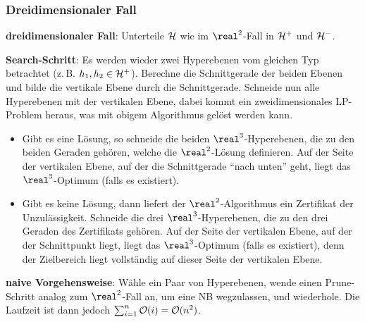 \pagebreak

\subsubsection{%
    Dreidimensionaler Fall%
}

\textbf{dreidimensionaler Fall}:
Unterteile $\mathcal{H}$ wie im $\real^2$-Fall in $\mathcal{H}^+$ und $\mathcal{H}^-$.

\textbf{Search-Schritt}:
Es werden wieder zwei Hyperebenen vom gleichen Typ betrachtet (z.\,B. $h_1, h_2 \in \mathcal{H}^+$).
Berechne die Schnittgerade der beiden Ebenen und bilde die vertikale Ebene durch die Schnittgerade.
Schneide nun alle Hyperebenen mit der vertikalen Ebene,
dabei kommt ein zweidimensionales LP-Problem heraus, was mit obigem Algorithmus gelöst werden kann.
\begin{itemize}
    \item
    Gibt es eine Lösung, so schneide die beiden $\real^3$-Hyperebenen, die zu den beiden Geraden
    gehören, welche die $\real^2$-Lösung definieren.
    Auf der Seite der vertikalen Ebene, auf der die Schnittgerade "`nach unten"' geht,
    liegt das $\real^3$-Optimum (falls es existiert).

    \item
    Gibt es keine Lösung, dann liefert der $\real^2$-Algorithmus ein Zertifikat der Unzulässigkeit.
    Schneide die drei $\real^3$-Hyperebenen, die zu den drei Geraden des Zertifikats gehören.
    Auf der Seite der vertikalen Ebene, auf der der Schnittpunkt liegt, liegt das $\real^3$-Optimum
    (falls es existiert), denn der Zielbereich liegt vollständig auf dieser Seite der vertikalen
    Ebene.
\end{itemize}

\linie

\textbf{naive Vorgehensweise}:
Wähle ein Paar von Hyperebenen, wende einen Prune-Schritt analog zum $\real^2$-Fall an,
um eine NB wegzulassen, und wiederhole.
Die Laufzeit ist dann jedoch $\sum_{i=1}^n \mathcal{O}(i) = \mathcal{O}(n^2)$.


